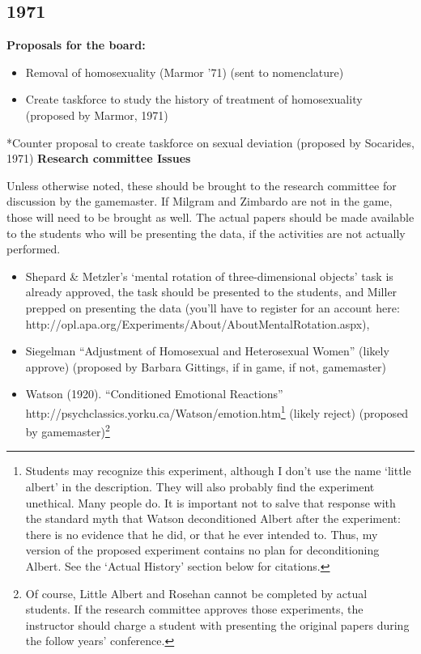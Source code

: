 \begin{refsection}
\subsection{1971}
\label{1971}

\textbf{Proposals for the board:}

\begin{itemize}
\item Removal of homosexuality (Marmor '71) (sent to nomenclature)

\item Create taskforce to study the history of treatment of homosexuality (proposed by Marmor, 1971)

\end{itemize}

*Counter proposal to create taskforce on sexual deviation (proposed by Socarides, 1971)
 \textbf{Research committee Issues}

Unless otherwise noted, these should be brought to the research committee for discussion by the gamemaster. If Milgram and Zimbardo are not in the game, those will need to be brought as well. The actual papers should be made available to the students who will be presenting the data, if the activities are not actually performed.

\begin{itemize}
\item Shepard \& Metzler's `mental rotation of three-dimensional objects' task is already approved, the task should be presented to the students, and Miller prepped on presenting the data (you'll have to register for an account here: http:\slash \slash opl.apa.org\slash Experiments\slash About\slash AboutMentalRotation.aspx), 

\item Siegelman ``Adjustment of Homosexual and Heterosexual Women'' (likely approve) (proposed by Barbara Gittings, if in game, if not, gamemaster)

\item Watson (1920). ``Conditioned Emotional Reactions'' http:\slash \slash psychclassics.yorku.ca\slash Watson\slash emotion.htm\footnote{Students may recognize this experiment, although I don't use the name `little albert' in the description. They will also probably find the experiment unethical. Many people do. It is important not to salve that response with the standard myth that Watson deconditioned Albert after the experiment: there is no evidence that he did, or that he ever intended to. Thus, my version of the proposed experiment contains no plan for deconditioning Albert. See the `Actual History' section below for citations.} (likely reject) (proposed by gamemaster)\footnote{Of course, Little Albert and Rosehan cannot be completed by actual students. If the research committee approves those experiments, the instructor should charge a student with presenting the original papers during the follow years' conference.}


\end{itemize}
\end{refsection}
